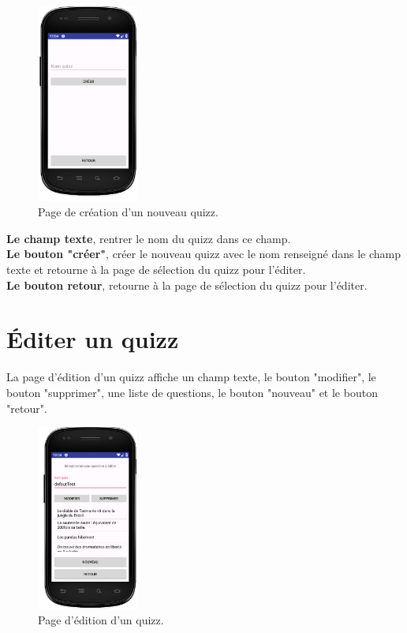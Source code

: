 \documentclass[a4paper]{report}
\begin{document}
\begin{figure}[h]
\centering
\includegraphics[width=0.3\textwidth]{newQuizz.png}
\caption{\label{fig:Nouveau quizz}Page de création d'un nouveau quizz.}
\end{figure}

\textbf{Le champ texte}, rentrer le nom du quizz dans ce champ. \\
\textbf{Le bouton "créer"}, créer le nouveau quizz avec le nom renseigné dans le champ texte et retourne à la page de sélection du quizz pour l'éditer. \\
\textbf{Le bouton retour}, retourne à la page de sélection du quizz pour l'éditer. \\


\newpage
\section{Éditer un quizz}
La page d'édition d'un quizz affiche un champ texte, le bouton "modifier", le bouton "supprimer", une liste de questions, le bouton "nouveau" et le bouton "retour".

\begin{figure}[h]
\centering
\includegraphics[width=0.3\textwidth]{editerQuizz.png}
\caption{\label{fig:Éditer un quizz}Page d'édition d'un quizz.}
\end{figure}
\end{document}
